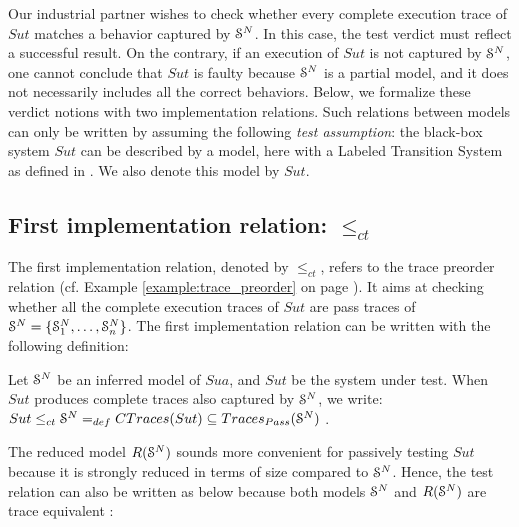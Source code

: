 Our industrial partner wishes to check whether every complete
execution trace of $\mathit{Sut}$ matches a behavior captured by
$\EuScript{S}^{N}$. In this case, the test verdict must reflect a
successful result. On the contrary, if an execution of
$\mathit{Sut}$ is not captured by $\EuScript{S}^{N}$, one cannot
conclude that $\mathit{Sut}$ is faulty because $\EuScript{S}^{N}$
is a partial model, and it does not necessarily includes all the
correct behaviors. Below, we formalize these verdict notions
with two implementation relations. Such relations between models
can only be written by assuming the following \emph{test
assumption}: the black-box system $\mathit{Sut}$ can be described
by a model, here with a Labeled Transition System as defined in
. We also
denote this model by $\mathit{Sut}$.

\subsection{First implementation relation: $\leq_{ct}$}

The first implementation relation, denoted by $\leq_{ct}$, refers
to the trace preorder relation
\cite{DNH84,vaandrager1991relationship} (cf. Example
\ref{example:trace_preorder} on page
\pageref{example:trace_preorder}).
It aims at checking whether all the complete execution traces of
$\mathit{Sut}$ are pass traces of
$\EuScript{S}^{N}=\{\EuScript{S}_1^{N},\dots,\EuScript{S}_n^{N}\}$.
The first implementation relation can be written with the
following definition:

\begin{definition}
\label{rel:impl1}

Let $\EuScript{S}^{N}$ be an inferred model of $\mathit{Sua}$, and
$\mathit{Sut}$ be the system under test. When $\mathit{Sut}$
produces complete traces also captured by $\EuScript{S}^{N}$, we
write: ${Sut} \leq_{ct} \EuScript{S}^{N} =_{def} CTraces({Sut})
\subseteq  Traces_{Pass}(\EuScript{S}^{N})$ \cite{Tre96}.
\end{definition}

The reduced model $R(\EuScript{S}^{N})$ sounds more convenient
for passively testing $\mathit{Sut}$ because it is strongly
reduced in terms of size compared to $\EuScript{S}^{N}$.  Hence,
the test relation can also be written as below because both models
$\EuScript{S}^{N}$ and $R(\EuScript{S}^{N})$ are trace
equivalent \cite{petrenko06}:

